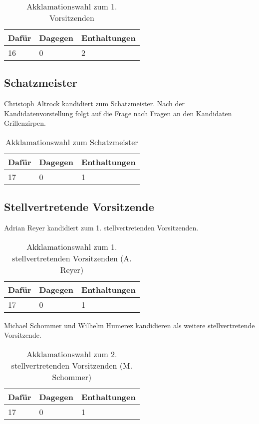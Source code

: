 \documentclass[a4paper]{scrartcl}
\begin{document}
\begin{table}[h]
	\begin{tabularx}{\textwidth}{XXX}
		Dafür & Dagegen & Enthaltungen\\
		\toprule
		16 & 0 & 2\\
	\end{tabularx}
	\caption{Akklamationswahl zum 1. Vorsitzenden}
\end{table}

\subsection{Schatzmeister}
Christoph Altrock kandidiert zum Schatzmeister.
Nach der Kandidatenvorstellung folgt auf die Frage nach Fragen an den Kandidaten Grillenzirpen.

\begin{table}[h]
	\begin{tabularx}{\textwidth}{XXX}
		Dafür & Dagegen & Enthaltungen\\
		\toprule
		17 & 0 & 1\\
	\end{tabularx}
	\caption{Akklamationswahl zum Schatzmeister}
\end{table}

\subsection{Stellvertretende Vorsitzende}
Adrian Reyer kandidiert zum 1. stellvertretenden Vorsitzenden.

\begin{table}[h]
	\begin{tabularx}{\textwidth}{XXX}
		Dafür & Dagegen & Enthaltungen\\
		\toprule
		17 & 0 & 1\\
	\end{tabularx}
	\caption{Akklamationswahl zum 1. stellvertretenden Vorsitzenden (A. Reyer)}
\end{table}

\clearpage

Michael Schommer und Wilhelm Humerez kandidieren als weitere stellvertretende Vorsitzende.

\begin{table}[h]
	\begin{tabularx}{\textwidth}{XXX}
		Dafür & Dagegen & Enthaltungen\\
		\toprule
		17 & 0 & 1\\
	\end{tabularx}
	\caption{Akklamationswahl zum 2. stellvertretenden Vorsitzenden (M. Schommer)}
\end{table}
\end{document}
